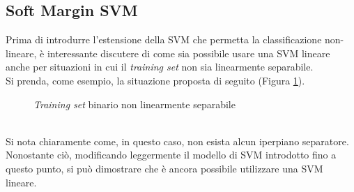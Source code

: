 \subsection{Soft Margin SVM}
Prima di introdurre l'estensione della SVM che permetta la classificazione non-lineare, è interessante discutere di come sia possibile usare una SVM lineare anche per situazioni in cui il \emph{training set} non sia linearmente separabile.\\
Si prenda, come esempio, la situazione proposta di seguito (Figura \ref{fig:Dataset_nonseparabile}).
 \begin{figure}[!ht]
 \center
{}
    \caption{\emph{Training set} binario non linearmente separabile}
    \label{fig:Dataset_nonseparabile}
  \end{figure}
\\
Si nota chiaramente come, in questo caso, non esista alcun iperpiano separatore. 
Nonostante ciò, modificando leggermente il modello di SVM introdotto fino a questo punto, si può dimostrare che è ancora possibile utilizzare una SVM lineare.\\

